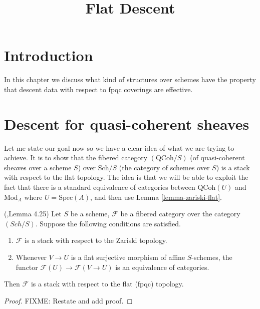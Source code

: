 

%


\title{Flat Descent}

\maketitle

\tableofcontents

\section{Introduction}
\label{section-introduction}

\noindent
In this chapter we discuss what kind of structures over schemes
have the property that descent data with respect to fpqc coverings
are effective.

\section{Descent for quasi-coherent sheaves}
\label{section-equivalence}

\noindent
Let me state our goal now so we have a clear idea of what we are
trying to achieve. It is to show that the fibered category $(\text{QCoh}/S)$
(of quasi-coherent sheaves over a scheme $S$) over $\text{Sch}/S$ (the
category of schemes over $S$) is a stack with respect to the flat
topology.  The idea is that we will be able to exploit the fact that
there is a standard equivalence of categories between $\text{QCoh}(U)$ and
$\text{Mod}_A$ where $U = \text{Spec}(A)$, and then use Lemma 
\ref{lemma-zariski-flat}.

\begin{lemma}
\label{lemma-zariski-flat}
(\cite{Vis2},Lemma 4.25)
Let $S$ be a scheme, $\mathcal F$ be a fibered category over the
category $(Sch/S)$.  Suppose the following conditions are satisfied.
\begin{enumerate}
\item $\mathcal F$ is a stack with respect to the Zariski topology.
\item Whenever $V \rightarrow U$ is a flat surjective morphism of affine
$S$-schemes, the functor
$\mathcal F(U) \rightarrow  \mathcal F(V \rightarrow U)$ is an equivalence of
categories.
\end{enumerate}
Then $\mathcal F$ is a stack with respect to the flat (fpqc) topology.	
\end{lemma}

\begin{proof}
FIXME: Restate and add proof.
\end{proof}

